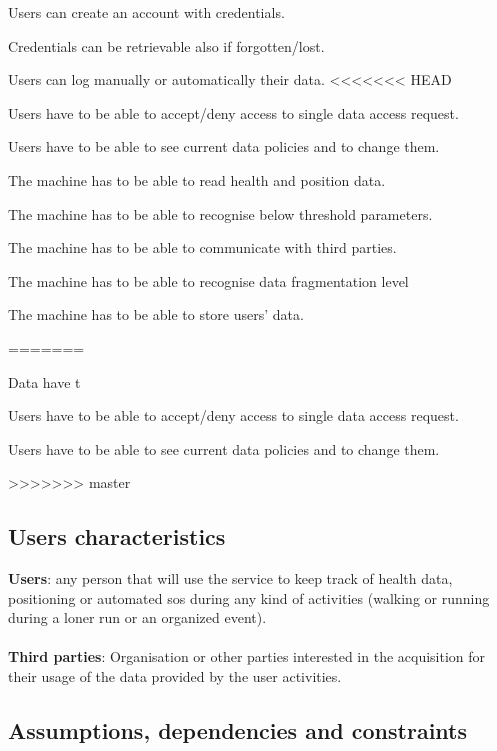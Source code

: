 \documentclass{article}
\begin{document}
\begin{enumerate}[label={[R\arabic*]}]
    	\item Users can create an account with credentials.
    	\item Credentials can be retrievable also if forgotten/lost.
    	\item Users can log manually or automatically their data.
<<<<<<< HEAD
    	\item Users have to be able to accept/deny access to single data access request.
    	\item Users have to be able to see current data policies and to change them.
    	\item The machine has to be able to read health and position data.
		\item The machine has to be able to recognise below threshold parameters.
		\item The machine has to be able to communicate with third parties.
		\item The machine has to be able to recognise data fragmentation level 
		\item The machine has to be able to store users’ data. 


=======
    	\item Data have t
    	\item Users have to be able to accept/deny access to single data access request.
    	\item Users have to be able to see current data policies and to change them.
    	\item 
>>>>>>> master
\end{enumerate}

\subsection{Users characteristics}
\textbf{Users}: any person that will use the service to keep track of health data, positioning or automated sos during any kind of activities (walking or running during a loner run or an organized event).\\\\
\textbf{Third parties}: Organisation or other parties interested in the acquisition for their usage of the data provided by the user activities.

\subsection{Assumptions, dependencies and constraints}
\end{document}
